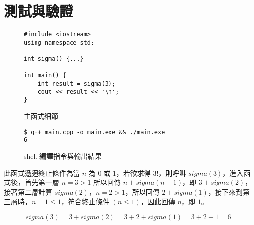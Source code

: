 \chapter{測試與驗證}

\begin{figure}[ht]
    \begin{verbatim}
#include <iostream>
using namespace std;

int sigma() {...}

int main() {
    int result = sigma(3);
    cout << result << '\n';
}
    \end{verbatim}

    \captionsetup{justification=centering}
    \caption{主函式細節}
    \label{fig:主函式細節}
\end{figure}

\begin{figure}[ht]
    \begin{verbatim}
$ g++ main.cpp -o main.exe && ./main.exe
6
    \end{verbatim}

    \captionsetup{justification=centering}
    \caption{shell 編譯指令與輸出結果}
    \label{fig:shell 編譯指令與輸出結果}
\end{figure}

此函式遞迴終止條件為當 $n$ 為 $0$ 或 $1$，若欲求得 $3!$，則呼叫 $sigma(3)$，進入函式後，首先第一層 $n = 3 > 1$ 所以回傳 $n + sigma(n − 1)$，即 $3 + sigma(2)$，接著第二層計算 $sigma(2)$，$n = 2 > 1$，所以回傳 $2 + sigma(1)$，接下來到第三層時，$n = 1 \le 1$，符合終止條件 $(n ≤ 1)$，因此回傳 $n$，即 $1$。

$$sigma(3)=3+sigma(2)=3+2+sigma(1)=3+2+1=6$$